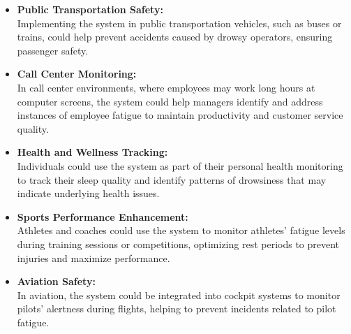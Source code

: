 \documentclass[12pt]{article}
\begin{document}
\begin{itemize}
\item \textbf{Public Transportation Safety:}\\  Implementing the system in public transportation vehicles, such as buses or trains, could help prevent accidents caused by drowsy operators, ensuring passenger safety.
\item \textbf{Call Center Monitoring:}\\ In call center environments, where employees may work long hours at computer screens, the system could help managers identify and address instances of employee fatigue to maintain productivity and customer service quality.
\item \textbf{Health and Wellness Tracking:}\\ Individuals could use the system as part of their personal health monitoring to track their sleep quality and identify patterns of drowsiness that may indicate underlying health issues.
\item \textbf{Sports Performance Enhancement:}\\ Athletes and coaches could use the system to monitor athletes' fatigue levels during training sessions or competitions, optimizing rest periods to prevent injuries and maximize performance.
\item \textbf{Aviation Safety:}\\ In aviation, the system could be integrated into cockpit systems to monitor pilots' alertness during flights, helping to prevent incidents related to pilot fatigue.
\end{itemize}
\newpage
\end{document}
